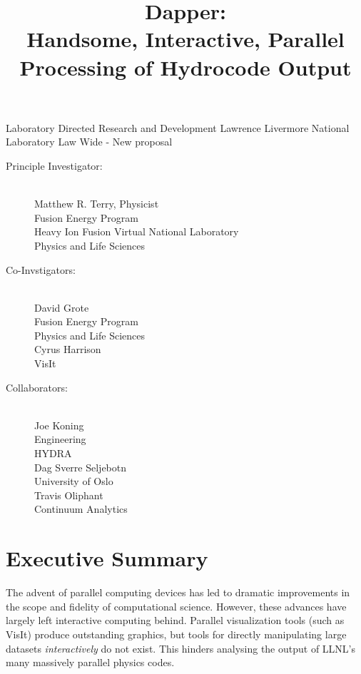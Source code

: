 \documentclass[a4paper]{article}
\title{Dapper:\\Handsome, Interactive, Parallel Processing of Hydrocode Output}
\author{}
\date{}
\begin{document}
\maketitle

Laboratory Directed Research and Development
Lawrence Livermore National Laboratory
Law Wide - New proposal
%
\begin{multicols}{2}
	\begin{description}
		\item[Principle Investigator:] \leavevmode \\
			Matthew R. Terry, Physicist \\
			Fusion Energy Program \\
			Heavy Ion Fusion Virtual National Laboratory \\
			Physics and Life Sciences

		\item[Co-Invstigators:] \leavevmode \\
			David Grote \\
			Fusion Energy Program \\
			Physics and Life Sciences \\
			
			Cyrus Harrison \\
			VisIt \\

		\columnbreak
		\item[Collaborators:] \leavevmode \\
			Joe Koning \\
			Engineering \\
			HYDRA \\

			Dag Sverre Seljebotn \\
			University of Oslo \\

			Travis Oliphant \\
			Continuum Analytics \\
	\end{description}
\end{multicols}



\section*{Executive Summary }

The advent of parallel computing devices has led to dramatic improvements in the scope and fidelity of computational science.  However, these advances have largely left interactive computing behind.  Parallel visualization tools (such as VisIt) produce outstanding graphics, but tools for directly manipulating large datasets \emph{interactively} do not exist.  This hinders analysing the output of LLNL's many massively parallel physics codes.
\end{document}

